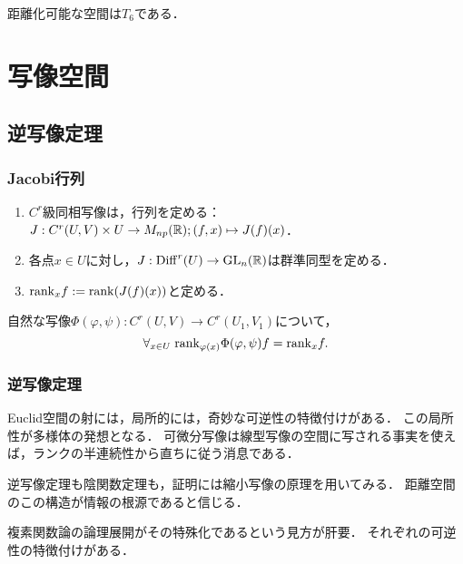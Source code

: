 \documentclass[uplatex,dvipdfmx]{jsreport}
\begin{document}
\begin{proposition}
    距離化可能な空間は$T_6$である．
\end{proposition}

\chapter{写像空間}

\section{逆写像定理}

\subsection{Jacobi行列}

\begin{definition}[Jacobi行列]\mbox{}
    \begin{enumerate}
        \item $C^r$級同相写像は，行列を定める：$J:C^r(U,V)\times U\to M_{np}(\mathbb{R});(f,x)\mapsto J(f)(x)$．
        \item 各点$x\in U$に対し，$J:\mathrm{Diff}^r(U)\to\mathrm{GL}_n(\mathbb{R})$は群準同型を定める．
        \item $\mathrm{rank}_xf:=\mathrm{rank}(J(f)(x))$と定める．
    \end{enumerate}
\end{definition}

\begin{lemma}
    自然な写像$\Phi(\varphi,\psi):C^r(U,V)\to C^r(U_1,V_1)$について，
    \[\forall_{x\in U}\;\mathrm{rank}_{\varphi(x)}\Phi(\varphi,\psi)f=\mathrm{rank}_xf.\]
\end{lemma}

\subsection{逆写像定理}

\begin{tcolorbox}[colframe=ForestGreen, colback=ForestGreen!10!white,breakable,colbacktitle=ForestGreen!40!white,coltitle=black,fonttitle=\bfseries\sffamily,
title=]
    Euclid空間の射には，局所的には，奇妙な可逆性の特徴付けがある．
    この局所性が多様体の発想となる．
    可微分写像は線型写像の空間に写される事実を使えば，ランクの半連続性から直ちに従う消息である．

    逆写像定理も陰関数定理も，証明には縮小写像の原理を用いてみる．
    距離空間のこの構造が情報の根源であると信じる．

    複素関数論の論理展開がその特殊化であるという見方が肝要．
    それぞれの可逆性の特徴付けがある．
\end{tcolorbox}
\end{document}

